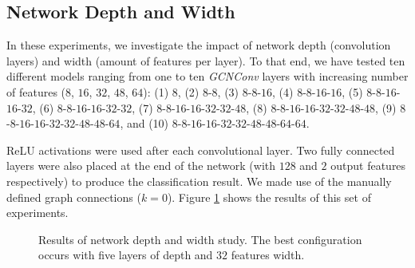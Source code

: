 \clearpage

\subsection{Network Depth and Width}

In these experiments, we investigate the impact of network depth (convolution layers) and width (amount of features per layer). To that end, we have tested ten different models ranging from one to ten \emph{GCNConv} layers with increasing number of features ($8$, $16$, $32$, $48$, $64$): (1) $8$, (2) $8$-$8$, (3) $8$-$8$-$16$, (4) $8$-$8$-$16$-$16$, (5) $8$-$8$-$16$-$16$-$32$, (6) $8$-$8$-$16$-$16$-$32$-$32$, (7) $8$-$8$-$16$-$16$-$32$-$32$-$48$, (8) $8$-$8$-$16$-$16$-$32$-$32$-$48$-$48$, (9) $8$-$8$-$16$-$16$-$32$-$32$-$48$-$48$-$64$, and (10) $8$-$8$-$16$-$16$-$32$-$32$-$48$-$48$-$64$-$64$.

\ac{ReLU} activations were used after each convolutional layer. Two fully connected layers were also placed at the end of the network (with $128$ and $2$ output features respectively) to produce the classification result. We made use of the manually defined graph connections ($k=0$). Figure \ref{fig:experiments_width_depth} shows the results of this set of experiments.

\begin{figure}[!htb]
  \caption{Results of network depth and width study. The best configuration occurs with five layers of depth and $32$ features width.}
  \label{fig:experiments_width_depth}
\end{figure}


